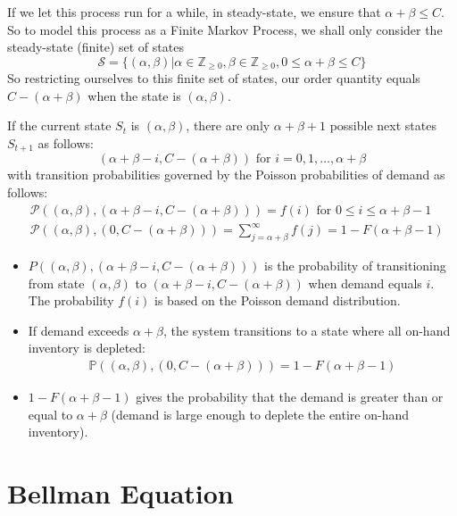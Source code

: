 \begin{appendices}
If we let this process run for a while, in steady-state, we ensure that $\alpha + \beta \leq C$. So to model this process as a Finite Markov Process, we shall only consider the steady-state (finite) set of states
$$\mathcal{S} = \{(\alpha, \beta) | \alpha \in \mathbb{Z}_{\geq 0}, \beta \in \mathbb{Z}_{\geq 0}, 0 \leq \alpha + \beta \leq C\}$$
So restricting ourselves to this finite set of states, our order quantity equals $C - (\alpha + \beta)$ when the state is $(\alpha, \beta)$.

If the current state $S_t$ is $(\alpha, \beta)$, there are only $\alpha + \beta + 1$ possible next states $S_{t+1}$ as follows\footnotemark:
$$(\alpha + \beta - i, C - (\alpha + \beta)) \text{ for } i =0, 1, \ldots, \alpha + \beta$$
with transition probabilities governed by the Poisson probabilities of demand as follows:
\begin{align*}
	&\mathcal{P}((\alpha, \beta), (\alpha + \beta - i, C - (\alpha + \beta))) = f(i)\text{ for } 0 \leq i \leq \alpha + \beta - 1\\
	&\mathcal{P}((\alpha, \beta), (0, C - (\alpha + \beta))) = \sum_{j=\alpha+\beta}^{\infty} f(j) = 1 - F(\alpha + \beta - 1)
\end{align*}
\begin{itemize}
	\item $P((\alpha, \beta), (\alpha + \beta - i, C - (\alpha + \beta)))$ is the probability of transitioning from state $(\alpha, \beta)$ to $(\alpha + \beta - i, C - (\alpha + \beta))$ when demand equals $i$. The probability $f(i)$ is based on the Poisson demand distribution.
	\item If demand exceeds $\alpha + \beta$, the system transitions to a state where all on-hand inventory is depleted:
		\begin{align*}
			\mathbb{P}((\alpha, \beta), (0, C - (\alpha + \beta))) = 1 - F(\alpha + \beta - 1)
		\end{align*}
	\item $1 - F(\alpha + \beta - 1)$ gives the probability that the demand is greater than or equal to $\alpha+\beta$ (\ie demand is large enough to deplete the entire on-hand inventory).
\end{itemize}


\section{Bellman Equation}
\label{appendix:bellman_equation}


\end{appendices}
